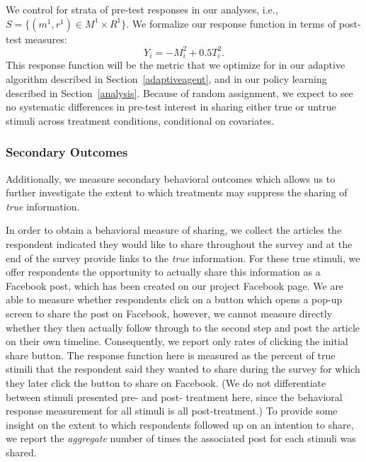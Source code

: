 \documentclass[letterpaper, 12pt, parskip=full,]{scrartcl}
\begin{document}
We control for strata of pre-test responses in our analyses, i.e., $S=\{(m^1, r^1)\in M^1 \times R^1\}$. 
We formalize our response function in terms of post-test measures:
\[
Y_i = -M^2_i + 0.5 T^2_i.
\]
This response function will be the metric that we optimize for in our adaptive algorithm described in Section~\ref{adaptiveagent}, and in our policy learning described in Section~\ref{analysis}. Because of random assignment, we expect to see no systematic differences in pre-test interest in sharing either true or untrue stimuli across treatment conditions, conditional on covariates. %




\subsubsection{Secondary Outcomes}
Additionally, we measure secondary behavioral outcomes which allows us to further investigate the extent to which treatments may suppress the sharing of \textit{true} information.

In order to obtain a behavioral measure of sharing, we collect the articles the respondent indicated they would like to share throughout the survey and at the end of the survey provide links to the \textit{true} information. For these true stimuli, we offer respondents the opportunity to actually share this information as a Facebook post, which has been created on our project Facebook page. We are able to measure whether respondents click on a button which opens a pop-up screen to share the post on Facebook, however, we cannot measure directly whether they then actually follow through to the second step and post the article on their own timeline. Consequently, we report only rates of clicking the initial share button. The response function here is measured as the percent of true stimili that the respondent said they wanted to share during the survey for which they later click the button to share on Facebook. (We do not differentiate between stimuli presented pre- and post- treatment here, since the behavioral response measurement for all stimuli is all post-treatment.) To provide some insight on the extent to which respondents followed up on an intention to share, we report the \textit{aggregate} number of times the associated post for each stimuli was shared. %
\end{document}
